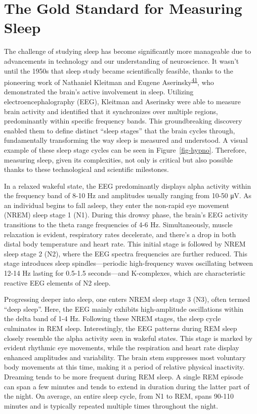 \documentclass[
  10pt,
]{scrbook}
\begin{document}
\hypertarget{the-gold-standard-for-measuring-sleep}{%
\section{The Gold Standard for Measuring
Sleep}\label{the-gold-standard-for-measuring-sleep}}

The challenge of studying sleep has become significantly more manageable
due to advancements in technology and our understanding of neuroscience.
It wasn't until the 1950s that sleep study became scientifically
feasible, thanks to the pioneering work of Nathaniel Kleitman and Eugene
Aserinsky\textsuperscript{\protect\hyperlink{ref-aserinsky_1953}{41}},
who demonstrated the brain's active involvement in sleep. Utilizing
electroencephalography (EEG), Kleitman and Aserinsky were able to
measure brain activity and identified that it synchronizes over multiple
regions, predominantly within specific frequency bands. This
groundbreaking discovery enabled them to define distinct ``sleep
stages'' that the brain cycles through, fundamentally transforming the
way sleep is measured and understood. A visual example of these sleep
stage cycles can be seen in Figure~\ref{fig-hypno}. Therefore, measuring
sleep, given its complexities, not only is critical but also possible
thanks to these technological and scientific milestones.

In a relaxed wakeful state, the EEG predominantly displays alpha
activity within the frequency band of 8-10 Hz and amplitudes usually
ranging from 10-50 μV. As an individual begins to fall asleep, they
enter the non-rapid eye movement (NREM) sleep stage 1 (N1). During this
drowsy phase, the brain's EEG activity transitions to the theta range
frequencies of 4-6 Hz. Simultaneously, muscle relaxation is evident,
respiratory rates decelerate, and there's a drop in both distal body
temperature and heart rate. This initial stage is followed by NREM sleep
stage 2 (N2), where the EEG spectra frequencies are further reduced.
This stage introduces sleep spindles---periodic high-frequency waves
oscillating between 12-14 Hz lasting for 0.5-1.5 seconds---and
K-complexes, which are characteristic reactive EEG elements of N2 sleep.

Progressing deeper into sleep, one enters NREM sleep stage 3 (N3), often
termed ``deep sleep''. Here, the EEG mainly exhibits high-amplitude
oscillations within the delta band of 1-4 Hz. Following these NREM
stages, the sleep cycle culminates in REM sleep. Interestingly, the EEG
patterns during REM sleep closely resemble the alpha activity seen in
wakeful states. This stage is marked by evident rhythmic eye movements,
while the respiration and heart rate display enhanced amplitudes and
variability. The brain stem suppresses most voluntary body movements at
this time, making it a period of relative physical inactivity. Dreaming
tends to be more frequent during REM sleep. A single REM episode can
span a few minutes and tends to extend in duration during the latter
part of the night. On average, an entire sleep cycle, from N1 to REM,
spans 90-110 minutes and is typically repeated multiple times throughout
the night.
\end{document}
